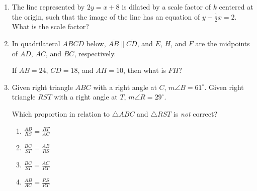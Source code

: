 \documentclass[12pt, oneside]{article}
\begin{document}
\begin{enumerate}[itemsep=2cm]
\item The line represented by $2y=x+8$ is dilated by a scale factor
of $k$ centered at the origin, such that the image of the line has an
equation of $y - \frac{1}{2} x=2$. What is the scale factor?

\item In quadrilateral $ABCD$ below, $\overline{AB} \parallel \overline{CD}$, and $E$, $H$, and $F$ are the midpoints of $\overline{AD}$, $\overline{AC}$,  and $\overline{BC}$, respectively.
\begin{center}
  \end{center}
If $AB=24$, $CD=18$, and $AH=10$, then what is $FH$?

\newpage
\item Given right triangle $ABC$ with a right angle at $C$, $m\angle B=61^\circ$. Given right triangle $RST$ with a right angle at $T$, $m\angle R=29^\circ$.
  \begin{center}
  \end{center}
Which proportion in relation to $\triangle ABC$ and $\triangle RST$ is \emph{not} correct?
  \begin{multicols}{2}
    \begin{enumerate}
      \item $\displaystyle \frac{AB}{RS} = \frac{RT}{AC}$
      \item $\displaystyle \frac{BC}{ST} = \frac{AB}{RS}$ 
      \item $\displaystyle \frac{BC}{ST} = \frac{AC}{RT}$
      \item $\displaystyle \frac{AB}{AC} = \frac{RS}{RT}$
    \end{enumerate}
  \end{multicols}


\end{enumerate}
\end{document}
